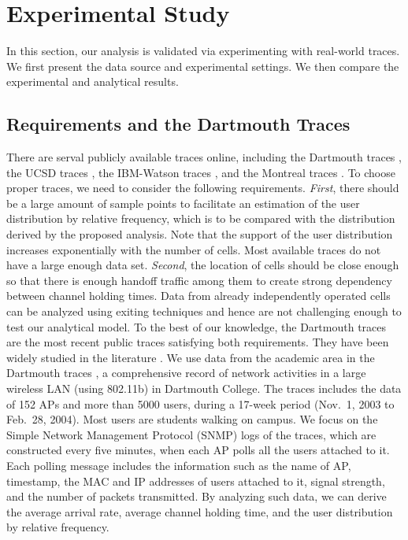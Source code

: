 
\section {Experimental Study} \label{section_experiment}

In this section, our analysis is validated via experimenting with real-world traces. We first present the data source and experimental settings.  We then compare the experimental and analytical results.

\subsection{Requirements and the Dartmouth Traces}
There are serval publicly available traces online, including the Dartmouth traces \cite{Trace-Dartmouth-Data01}\cite{Trace-Dartmouth-Data02}\cite{Trace-Dartmouth-Data03}, the UCSD traces \cite{Trace-UCSD2}, the IBM-Watson traces \cite{Trace-IBMWatson}, and the Montreal traces \cite{Trace-Montreal}. To choose proper traces, we need to consider the following requirements.  \emph{First}, there should be a large amount of sample points to facilitate an estimation of the user distribution by relative frequency, which is to be compared with the distribution derived by the proposed analysis. Note that the support of the user distribution increases exponentially with the number of cells.  Most available traces do not have a large enough data set. \emph{Second}, the location of cells should be close enough so that there is enough handoff traffic among them to create strong dependency between channel holding times.  Data from already independently operated cells can be analyzed using exiting techniques and hence are not challenging enough to test our analytical model.
To the best of our knowledge, the Dartmouth traces are the most recent public traces satisfying both requirements.  They have been widely studied in the literature \cite{Trace-Dartmouth-Paper01}\cite{Trace-Dartmouth-Paper}\cite{Experiment2}\cite{Mobility-Core1}.
We use data from the academic area in the Dartmouth traces \cite{Trace-Dartmouth-Data03}, a comprehensive record of network activities in a large wireless
LAN (using 802.11b) in Dartmouth College.  The traces includes the data of 152 APs and more than 5000 users, during a 17-week period (Nov.~1, 2003 to Feb.~28, 2004). Most users are students walking on campus.
We focus on the  Simple Network Management Protocol (SNMP) logs of the traces, which are constructed every five minutes, when each AP polls all the users attached to it. Each polling message includes the information such as the name of AP, timestamp, the MAC and IP addresses of users attached to it, signal strength, and the number of packets transmitted.  By analyzing such data, we can derive the average arrival rate, average channel holding time, and the user distribution by relative frequency.

